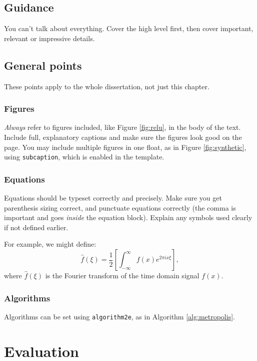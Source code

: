 \documentclass{l4proj}
\begin{document}
\section{Guidance}
You can't talk about everything. Cover the high level first, then cover important, relevant or impressive details.


\section{General points}
These points apply to the whole dissertation, not just this chapter.


\subsection{Figures}
\emph{Always} refer to figures included, like Figure \ref{fig:relu}, in the body of the text. Include full, explanatory captions and make sure the figures look good on the page.
You may include multiple figures in one float, as in Figure \ref{fig:synthetic}, using \texttt{subcaption}, which is enabled in the template.


\subsection{Equations}

Equations should be typeset correctly and precisely. Make sure you get parenthesis sizing correct, and punctuate equations correctly 
(the comma is important and goes \textit{inside} the equation block). Explain any symbols used clearly if not defined earlier. 

For example, we might define:
\begin{equation}
    \hat{f}(\xi) = \frac{1}{2}\left[ \int_{-\infty}^{\infty} f(x) e^{2\pi i x \xi} \right],
\end{equation}    
where $\hat{f}(\xi)$ is the Fourier transform of the time domain signal $f(x)$.

\subsection{Algorithms}
Algorithms can be set using \texttt{algorithm2e}, as in Algorithm \ref{alg:metropolis}.

\chapter{Evaluation} 

\end{document}
